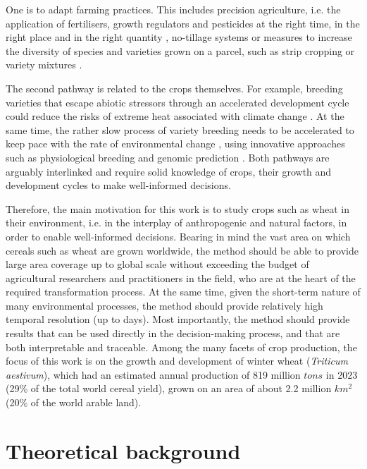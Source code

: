 One is to adapt farming practices. This includes precision agriculture, i.e. the application of fertilisers, growth regulators and pesticides at the right time, in the right place and in the right quantity \citep{finger_precision_2019}, no-tillage systems \citep{triplett_notillage_2008} or measures to increase the diversity of species and varieties grown on a parcel, such as strip cropping \citep{juventia_spatio-temporal_2022} or variety mixtures \citep{tschurr_mixing_2023}.

The second pathway is related to the crops themselves. For example, breeding varieties that escape abiotic stressors through an accelerated development cycle could reduce the risks of extreme heat associated with climate change \citep{rezaei_climate_2018, rogger_can_2021}. At the same time, the rather slow process of variety breeding needs to be accelerated to keep pace with the rate of environmental change \citep{zhang_climate_2022}, using innovative approaches such as physiological breeding \citep{reynolds_physiological_2016} and genomic prediction \citep{desta_genomic_2014}. Both pathways are arguably interlinked and require solid knowledge of crops, their growth and development cycles to make well-informed decisions.

Therefore, the main motivation for this work is to study crops such as wheat in their environment, i.e. in the interplay of anthropogenic and natural factors, in order to enable well-informed decisions. Bearing in mind the vast area on which cereals such as wheat are grown worldwide, the method should be able to provide large area coverage up to global scale without exceeding the budget of agricultural researchers and practitioners in the field, who are at the heart of the required transformation process. At the same time, given the short-term nature of many environmental processes, the method should provide relatively high temporal resolution (up to days). Most importantly, the method should provide results that can be used directly in the decision-making process, and that are both interpretable and traceable. Among the many facets of crop production, the focus of this work is on the growth and development of winter wheat (\textsl{Triticum aestivum}), which had an estimated annual production of 819 million $tons$ in 2023 (29\% of the total world cereal yield), grown on an area of about 2.2 million $km^2$ (20\% of the world arable land).

\section{Theoretical background}
